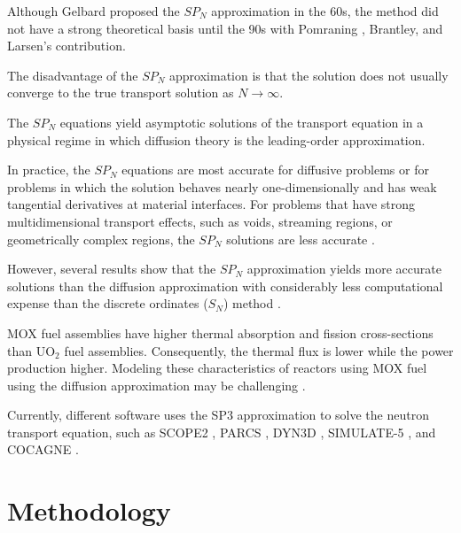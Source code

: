 \documentclass{anstrans}
\begin{document}
Although Gelbard proposed the $SP_N$ approximation in the 60s, the method did not have a strong theoretical basis until the 90s with Pomraning \cite{pomraning_asymptotic_1993}, Brantley, and Larsen's \cite{brantley_simplifiedP3_2000} contribution.

The disadvantage of the $SP_N$ approximation is that the solution does not usually converge to the true transport solution as $N \rightarrow \infty$.

The $SP_N$ equations yield asymptotic solutions of the transport equation in a physical regime in which diffusion theory is the leading-order approximation.

In practice, the $SP_N$ equations are most accurate for diffusive problems or for problems in which the solution behaves nearly one-dimensionally and has weak tangential derivatives at material interfaces.
For problems that have strong multidimensional transport effects, such as voids, streaming regions, or geometrically complex regions, the $SP_N$ solutions are less accurate \cite{downar_parcs_2004}.

However, several results show that the $SP_N$ approximation yields more accurate solutions than the diffusion approximation \cite{mui_modified_1987} \cite{beckert_development_2007} \cite{fliscounakis_potential_2012} \cite{ryu_finite_2013} \cite{khosravi_mirzaee_reactor_2019} with considerably less computational expense than the discrete ordinates ($S_N$) method \cite{brantley_simplifiedP3_2000}.


MOX fuel assemblies have higher thermal absorption and fission cross-sections than UO$_2$ fuel assemblies.
Consequently, the thermal flux is lower while the power production higher.
Modeling these characteristics of reactors using MOX fuel using the diffusion approximation may be challenging \cite{brantley_simplifiedP3_2000} \cite{capilla_applications_2009}.


Currently, different software uses the SP3 approximation to solve the neutron transport equation, such as SCOPE2 \cite{tatsumi_object-oriented_2002}, PARCS \cite{downar_parcs_2004}, DYN3D \cite{beckert_development_2007}, SIMULATE-5 \cite{bahadir_studsviks_2009}, and COCAGNE \cite{fliscounakis_potential_2012}.




\section{Methodology}
\end{document}
